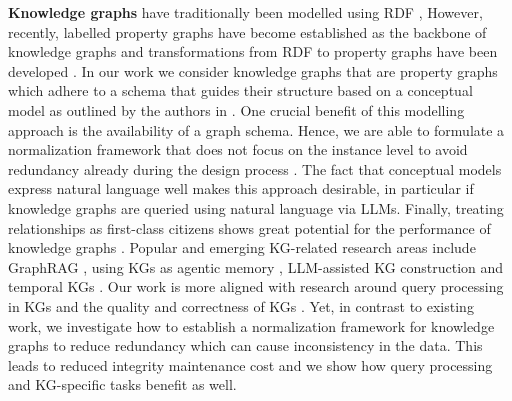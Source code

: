 \documentclass[sigconf]{acmart}
\begin{document}
\textbf{Knowledge graphs} have traditionally been modelled using RDF \cite{W3C_RDF, Tomaszuk_20_RDF_Knowledge_Representation_For_Web}, However, recently, labelled property graphs \cite{Angles_2018_Property_Graph_Model, Pierro_23_LPG_Based_KGs} have become established as the backbone of knowledge graphs and transformations from RDF to property graphs have been developed \cite{Angles_20_RDF_to_LPG, Rabbani_24_RDF_to_LPG_Transformation}. In our work we consider knowledge graphs that are property graphs which adhere to a schema that guides their structure based on a conceptual model as outlined by the authors in \cite{Skavantzos_25_ER_Graphs}. One crucial benefit of this modelling approach is the availability of a graph schema. Hence, we are able to formulate a normalization framework that does not focus on the instance level to avoid redundancy already during the design process \cite{Kolahi_10_Analysis_of_Worst_Case_Redundancy}. The fact that conceptual models express natural language well \cite{Chen_83_English_Language_and_ER_Diagram, Omar_20_Conceptual_Model_Development_From_Natural_Language} makes this approach desirable, in particular if knowledge graphs are queried using natural language via LLMs. Finally, treating relationships as first-class citizens shows great potential for the performance of knowledge graphs \cite{Panda_24_Hyper_Relational_KGs_for_Multi_Hop_Questions, Nooijen_26_Meta_Property_KGs}. Popular and emerging KG-related research areas include GraphRAG \cite{Peng_26_GraphRAG_Survey}, using KGs as agentic memory \cite{Wu_26_Hierarchical_Graph_Based_Agentic_Memory}, LLM-assisted KG construction \cite{Mihindukulasooriya_25_Prompt_Optimization_KG_Construction} and temporal KGs \cite{Hou_25_Graph_DB_With_Built_in_Temporal_Support}. Our work is more aligned with research around query processing in KGs \cite{Alotaibi_21_PG_Schema_Optimization_for_KGs} and the quality and correctness of KGs \cite{Gao_19_KG_Accuracy_Evaluation, Marchesin_24_Estimation_KG_Accuracy}. Yet, in contrast to existing work, we investigate how to establish a normalization framework for knowledge graphs to reduce redundancy which can cause inconsistency in the data. This leads to reduced integrity maintenance cost and we show how query processing and KG-specific tasks benefit as well.
\end{document}
